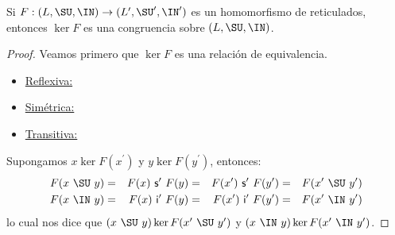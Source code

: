   \begin{lemma}
    \PN Si $F: (L, \SU, \IN) \rightarrow (L^{\prime}, \SU^{\prime}, \IN^{\prime})$ es un homomorfismo de reticulados,
    entonces $\ker F$ es una congruencia sobre $(L, \SU, \IN)$.
  \end{lemma}
  \begin{proof}
    \PN Veamos primero que $\ker F$ es una relación de equivalencia.
    \begin{itemize}
      \item \underline{Reflexiva:}
      \item \underline{Simétrica:}
      \item \underline{Transitiva:}
      \end{itemize}

    \PN Supongamos $x \ker F(x^{\prime})$ y $y \ker F(y^{\prime})$, entonces:
    \begin{alignat*}{4}
      F(x \ \SU \ y) &=& F(x) \ \mathsf{s^{\prime}} \ F(y) &=& F(x^{\prime}) \ \mathsf{s^{\prime}} \ F(y^{\prime}) &=&
        F(x^{\prime} \ \SU \ y^{\prime}) \\
      F(x \ \IN \ y) &=& F(x) \ \mathsf{i^{\prime}} \ F(y) &=& F(x^{\prime}) \ \mathsf{i^{\prime}} \ F(y^{\prime}) &=&
        F(x^{\prime} \ \IN \ y^{\prime}) \\
    \end{alignat*}
    \PN lo cual nos dice que $(x \ \SU \ y) \ker F(x^{\prime} \ \SU \ y^{\prime})$ y $(x \ \IN \ y) \ker F(x^{\prime} \
    \IN \ y^{\prime})$.
  \end{proof}

